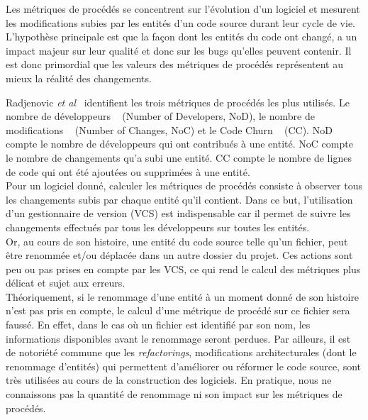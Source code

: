 Les métriques de procédés se concentrent sur l'évolution d'un logiciel et mesurent les modifications subies par les entités d'un code source durant leur cycle de vie. L'hypothèse principale est que la façon dont les entités du code ont changé, a un impact majeur sur leur qualité et donc sur les bugs qu'elles peuvent contenir. Il est donc primordial que les valeurs des métriques de procédés représentent au mieux la réalité des changements.

Radjenovic \emph{et al}~\cite{radjenovic_software_2013} identifient les trois métriques de procédés les plus utilisés. Le nombre de développeurs ~\cite{weyuker_too_2008} (Number of Developers, NoD), le nombre de modifications ~\cite{graves_predicting_2000} (Number of Changes, NoC) et le Code Churn ~\cite{munson_code_1998} (CC). NoD compte le nombre de développeurs qui ont contribués à une entité. NoC compte le nombre de changements qu'a subi une entité. CC compte le nombre de lignes de code qui ont été ajoutées ou supprimées à une entité.\\

Pour un logiciel donné, calculer les métriques de procédés consiste à observer tous les changements subis par chaque entité qu'il contient. Dans ce but, l'utilisation d'un gestionnaire de version (VCS) est indispensable car il permet de suivre les changements effectués par tous les développeurs sur toutes les entités.\\ 

Or, au cours de son histoire, une entité du code source telle qu'un fichier, peut être renommée et/ou déplacée dans un autre dossier du projet. Ces actions sont peu ou pas prises en compte par les VCS, ce qui rend le calcul des métriques plus délicat et sujet aux erreurs.\\

Théoriquement, si le renommage d'une entité à un moment donné de son histoire n'est pas pris en compte, le calcul d'une métrique de procédé sur ce fichier sera faussé. En effet, dans le cas où un fichier est identifié par son nom, les informations disponibles avant le renommage seront perdues. Par ailleurs, il est de notoriété commune que les \textit{refactorings}, modifications architecturales (dont le renommage d'entités) qui permettent d'améliorer ou réformer le code source, sont très utilisées au cours de la construction des logiciels. En pratique, nous ne connaissons pas la quantité de renommage ni son impact sur les métriques de procédés.\\

